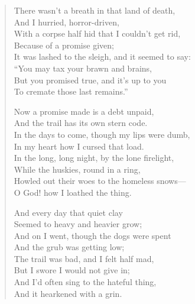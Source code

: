 \begin{verse}
There wasn’t a breath in that land of death,\\
\hspace*{2em}And I hurried, horror-driven,\\
With a corpse half hid that I couldn’t get rid,\\
\hspace*{2em}Because of a promise given;\\
It was lashed to the sleigh, and it seemed to say:\\
\hspace*{2em}“You may tax your brawn and brains,\\
But you promised true, and it’s up to you\\
\hspace*{2em}To cremate those last remains.”

Now a promise made is a debt unpaid,\\
\hspace*{2em}And the trail has its own stern code.\\
In the days to come, though my lips were dumb,\\
\hspace*{2em}In my heart how I cursed that load.\\
In the long, long night, by the lone firelight,\\
\hspace*{2em}While the huskies, round in a ring,\\
Howled out their woes to the homeless snows—\\
\hspace*{2em}O God! how I loathed the thing.

And every day that quiet clay\\
\hspace*{2em}Seemed to heavy and heavier grow;\\
And on I went, though the dogs were spent\\
\hspace*{2em}And the grub was getting low;\\
The trail was bad, and I felt half mad,\\
\hspace*{2em}But I swore I would not give in;\\
And I’d often sing to the hateful thing,\\
\hspace*{2em}And it hearkened with a grin.


\end{verse}
